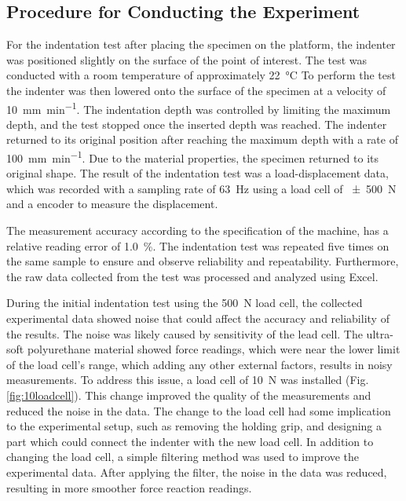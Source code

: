 \subsection*{Procedure for Conducting the Experiment}
For the indentation test after placing the specimen on the platform,
the indenter was positioned slightly on the surface of the point of interest. 
The test was conducted with a room temperature of approximately \SI{22}{\degreeCelsius}
To perform the test the indenter was then lowered onto the surface of the specimen
at a velocity of \SI[per-mode = symbol]{10}{\milli \m\per \minute}.
The indentation depth was controlled by limiting the maximum depth, and the 
test stopped once the inserted depth was reached. The indenter returned to its 
original position after reaching the maximum depth with a rate of 
\SI[per-mode = symbol]{100}{\milli \m\per \minute}. Due to the material properties,
the specimen returned to its original shape.
The result of the indentation test was a load-displacement data,
which was recorded with a sampling rate of \SI{63}{\hertz} using a load 
cell of \SI{\pm 500}{\newton} and a encoder to measure the displacement.

The measurement accuracy according to the specification of the machine, has 
a relative reading error of \SI{1.0}{\percent}. The indentation test 
was repeated five times on the same sample to ensure and observe 
reliability and repeatability. Furthermore, the raw data collected from the test 
was processed and analyzed using Excel.

During the initial indentation test using the \SI{500}{\newton} load cell, 
the collected experimental data showed noise that could affect the accuracy 
and reliability of the results. The noise was likely caused by sensitivity 
of the lead cell. The ultra-soft polyurethane material showed force readings, which 
were near the lower limit of the load cell's range, which adding any other external factors, 
results in noisy measurements. To address this issue, a load cell of \SI{10}{\newton}
was installed (Fig. \ref{fig:10loadcell}). This change improved the quality of 
the measurements and reduced the noise in the data. The change to the load cell had some 
implication to the experimental setup, such as removing the holding grip, and designing 
a part which could connect the indenter with the new load cell. In addition to changing 
the load cell, a simple filtering method was used to improve the experimental data. After 
applying the filter, the noise in the data was reduced, resulting in more smoother 
force reaction readings. 

